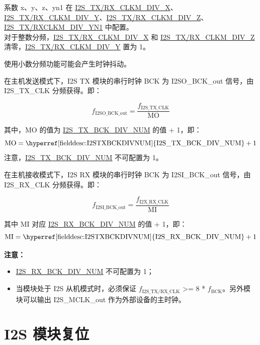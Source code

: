 \documentclass[main\_\_CN.tex]{subfiles}
\begin{document}
系数 x、y、z、yn1 在 \hyperref[fielddesc:I2STXCLKMDIVX]{I2S\_TX/RX\_CLKM\_DIV\_X}、\hyperref[fielddesc:I2STXCLKMDIVY]{I2S\_TX/RX\_CLKM\_DIV\_Y}、\hyperref[fielddesc:I2STXCLKMDIVZ]{I2S\_TX/RX\_CLKM\_DIV\_Z}、\hyperref[fielddesc:I2STXCLKMDIVYN1]{I2S\_TX/RXCLKM\_DIV\_YN1} 中配置。 \\
对于整数分频，\hyperref[fielddesc:I2STXCLKMDIVX]{I2S\_TX/RX\_CLKM\_DIV\_X} 和 \hyperref[fielddesc:I2STXCLKMDIVZ]{I2S\_TX/RX\_CLKM\_DIV\_Z} 清零，\hyperref[fielddesc:I2STXCLKMDIVY]{I2S\_TX/RX\_CLKM\_DIV\_Y} 置为 1。

\begin{tiplisting}
使用小数分频功能可能会产生时钟抖动。
\end{tiplisting}

在主机发送模式下，I2S TX 模块的串行时钟 BCK 为 I2SO\_BCK\_out 信号，由 I2S\_TX\_CLK 分频获得。即：

$$f_{\textrm{I2SO\_BCK\_out}} = \frac{f_{\textrm{I2S\_TX\_CLK}}}{\textrm{MO}}$$


其中，MO 的值为 \hyperref[fielddesc:I2STXBCKDIVNUM]{I2S\_TX\_BCK\_DIV\_NUM} 的值 + 1，即：
$$ \textrm{MO} = \textrm{\hyperref[fielddesc:I2STXBCKDIVNUM]{I2S\_TX\_BCK\_DIV\_NUM}} + 1 $$
注意，\hyperref[fielddesc:I2STXBCKDIVNUM]{I2S\_TX\_BCK\_DIV\_NUM} 不可配置为 1。

在主机接收模式下，I2S RX 模块的串行时钟 BCK 为 I2SI\_BCK\_out 信号，由 I2S\_RX\_CLK 分频获得。即：

$$f_{\textrm{I2SI\_BCK\_out}} = \frac{f_{\textrm{I2X\_RX\_CLK}}}{\textrm{MI}}$$

其中 MI 对应 \hyperref[fielddesc:I2SRXBCKDIVNUM]{I2S\_RX\_BCK\_DIV\_NUM} 的值 + 1，即：
$$ \textrm{MI} = \textrm{\hyperref[fielddesc:I2STXBCKDIVNUM]{I2S\_RX\_BCK\_DIV\_NUM}} + 1 $$


{\bfseries 注意：}
\begin{itemize}
    \item \hyperref[fielddesc:I2SRXBCKDIVNUM]{I2S\_RX\_BCK\_DIV\_NUM} 不可配置为 1；
    \item 当模块处于 I2S 从机模式时，必须保证 $f_{\textrm{I2S\_TX/RX\_CLK}}$ >= 8 * $f_{\textrm{BCK}}$。另外模块可以输出 I2S\_MCLK\_out 作为外部设备的主时钟。
    
\end{itemize}

\section{I2S 模块复位} \label{sec:i2s-reset}
\end{document}
